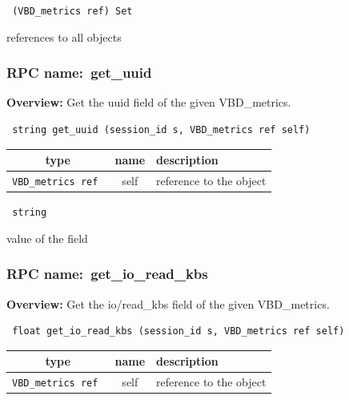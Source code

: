 \vspace{0.3cm}

{\tt 
(VBD\_metrics ref) Set
}


references to all objects
\vspace{0.3cm}
\vspace{0.3cm}
\vspace{0.3cm}
\subsubsection{RPC name:~get\_uuid}

{\bf Overview:} 
Get the uuid field of the given VBD\_metrics.

\begin{verbatim} string get_uuid (session_id s, VBD_metrics ref self)\end{verbatim}



 
\vspace{0.3cm}
\begin{tabular}{|c|c|p{7cm}|}
 \hline
{\bf type} & {\bf name} & {\bf description} \\ \hline
{\tt VBD\_metrics ref } & self & reference to the object \\ \hline 

\end{tabular}

\vspace{0.3cm}

{\tt 
string
}


value of the field
\vspace{0.3cm}
\vspace{0.3cm}
\vspace{0.3cm}
\subsubsection{RPC name:~get\_io\_read\_kbs}

{\bf Overview:} 
Get the io/read\_kbs field of the given VBD\_metrics.

\begin{verbatim} float get_io_read_kbs (session_id s, VBD_metrics ref self)\end{verbatim}



 
\vspace{0.3cm}
\begin{tabular}{|c|c|p{7cm}|}
 \hline
{\bf type} & {\bf name} & {\bf description} \\ \hline
{\tt VBD\_metrics ref } & self & reference to the object \\ \hline 

\end{tabular}

